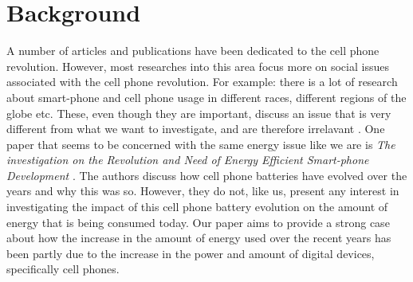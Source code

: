 \documentclass{article}
\begin{document}
\section{Background}
A number of articles and publications have been dedicated to the cell phone revolution. However, most researches into this area focus more on social issues associated with the cell phone revolution. For example: there is a lot of research about smart-phone and cell phone usage in different races, different regions of the globe etc. These, even though they are important, discuss an issue that is very different from what we want to investigate, and are therefore irrelavant . One paper that seems to be concerned with the same energy issue like we are is \textit{The investigation on the Revolution and Need of Energy Efficient Smart-phone Development} \cite{phoneBatteries}. The authors discuss how cell phone batteries have evolved over the years and why this was so. However, they do not, like us, present any interest in investigating the impact of this cell phone battery evolution on the amount of energy that is being consumed today. Our paper aims to provide a strong case about how the increase in the amount of energy used over the recent years has been partly due to the increase in the power and amount of digital devices, specifically cell phones. 
\end{document}

